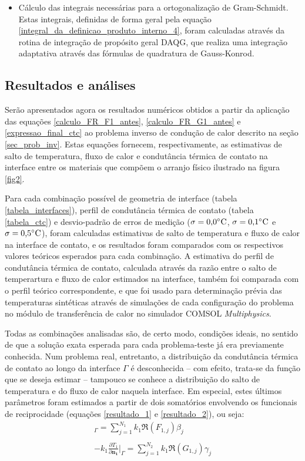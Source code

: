 \begin{itemize}
	\item Cálculo das integrais necessárias para a ortogonalização de Gram-Schmidt. Estas integrais, definidas de forma geral pela equação \eqref{integral_da_definicao_produto_interno_4}, foram calculadas através da rotina de integração de propósito geral DAQG, que realiza uma integração adaptativa através das fórmulas de quadratura de Gauss-Konrod.
\end{itemize}

\subsection{Resultados e análises}

Serão apresentados agora os resultados numéricos obtidos a partir da aplicação das equações \eqref{calculo_FR_F1_antes}, \eqref{calculo_FR_G1_antes} e \eqref{expressao_final_ctc} ao problema inverso de condução de calor descrito na seção \ref{sec_prob_inv}. Estas equações fornecem, respectivamente, as estimativas de salto de temperatura, fluxo de calor e condutância térmica de contato na interface entre os materiais que compõem o arranjo físico ilustrado na figura \ref{fig2}.

Para cada combinação possível de geometria de interface (tabela \ref{tabela_interfaces}), perfil de condutância térmica de contato (tabela \ref{tabela_ctc}) e desvio-padrão de erros de medição ($\sigma = \text{0,0}\celsius$, $\sigma = \text{0,1}\celsius$ e $\sigma = \text{0,5}\celsius$), foram calculadas estimativas de salto de temperatura e fluxo de calor na interface de contato, e os resultados foram comparados com os respectivos valores teóricos esperados para cada combinação. A estimativa do perfil de condutância térmica de contato, calculada através da razão entre o salto de temperartura e fluxo de calor estimados na interface, também foi comparada com o perfil teórico correspondente, e que foi usado para determinação prévia das temperaturas sintéticas através de simulações de cada configuração do problema no módulo de transferência de calor no simulador COMSOL \textit{Multiphysics}\textsuperscript{\textregistered}.

Todas as combinações analisadas são, de certo modo, condições ideais, no sentido de que a solução exata esperada para cada problema-teste já era previamente conhecida. Num problema real, entretanto, a distribuição da condutância térmica de contato ao longo da interface $\Gamma$ é desconhecida -- com efeito, trata-se da função que se deseja estimar -- tampouco se conhece a distribuição do salto de temperatura e do fluxo de calor naquela interface. Em especial, estes últimos parâmetros foram estimados a partir de dois somatórios envolvendo os funcionais de reciprocidade (equações \eqref{resultado_1} e \eqref{resultado_2}), ou seja:
\begin{align}
[T_1 - T_2]_\Gamma = \sum_{j=1}^{N_1} k_1 \Re(F_{1,j}) \beta_j \label{resultado_1_again} \\ \nonumber \\
- k_1 \frac{\partial T_1}{\partial\mathbf{n_1}}\bigg|_\Gamma = \sum_{j=1}^{N_2} k_1 \Re(G_{1,j}) \gamma_j \label{resultado_2_again}
\end{align}


